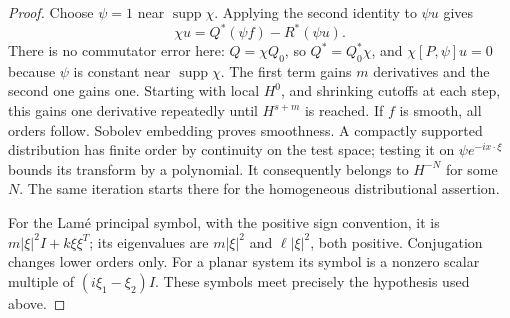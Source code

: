 \documentclass[11pt]{article}
\DeclareMathOperator{\supp}{supp}
\theoremstyle{remark}
\numberwithin{equation}{section}
\begin{document}
\begin{proof}
Choose $\psi=1$ near $\supp\chi$. Applying the second identity to
$\psi u$ gives
\[
 \chi u=Q^*(\psi f)-R^*(\psi u).
\]
There is no commutator error here: $Q=\chi Q_0$, so $Q^*=Q_0^*\chi$,
and $\chi[P,\psi]u=0$ because $\psi$ is constant near $\supp\chi$.
The first term gains $m$ derivatives and the second one gains one.
Starting with local $H^0$, and shrinking cutoffs at each step, this gains
one derivative repeatedly until $H^{s+m}$ is reached. If $f$ is smooth,
all orders follow. Sobolev embedding proves smoothness. A compactly
supported distribution has finite order by continuity on the test space;
testing it on $\psi e^{-ix\cdot\xi}$ bounds its transform by a polynomial.
It consequently belongs to $H^{-N}$ for some $N$. The same iteration
starts there for the homogeneous distributional assertion.

For the Lam\'e principal symbol, with the positive sign convention,
it is $m|\xi|^2I+k\xi\xi^T$; its eigenvalues are $m|\xi|^2$ and
$\ell|\xi|^2$, both positive. Conjugation changes lower orders only.
For a planar system its symbol is a nonzero scalar multiple of
$(i\xi_1-\xi_2)I$. These symbols meet precisely the hypothesis used above.
\end{proof}
\end{document}
